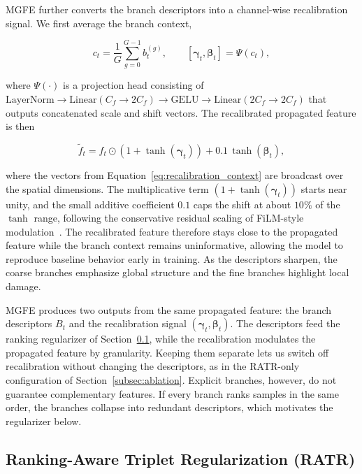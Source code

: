 MGFE further converts the branch descriptors into a channel-wise recalibration signal. We first average the branch context,

\begin{equation}
c_t = \frac{1}{G}\sum_{g=0}^{G-1}b_t^{(g)},
\qquad
[\boldsymbol{\gamma}_t,\boldsymbol{\beta}_t] = \Psi(c_t),
\label{eq:recalibration_context}
\end{equation}

where $\Psi(\cdot)$ is a projection head consisting of $\mathrm{LayerNorm}\!\rightarrow\!\mathrm{Linear}(C_f\!\rightarrow\!2C_f)\!\rightarrow\!\mathrm{GELU}\!\rightarrow\!\mathrm{Linear}(2C_f\!\rightarrow\!2C_f)$ that outputs concatenated scale and shift vectors. The recalibrated propagated feature is then

\begin{equation}
\widetilde{f}_t =
f_t \odot
\left(1+\tanh(\boldsymbol{\gamma}_t)\right)
+ 0.1\,\tanh(\boldsymbol{\beta}_t),
\label{eq:recalibration}
\end{equation}

where the vectors from Equation~\eqref{eq:recalibration_context} are broadcast over the spatial dimensions. The multiplicative term $(1+\tanh(\boldsymbol{\gamma}_t))$ starts near unity, and the small additive coefficient $0.1$ caps the shift at about $10\%$ of the $\tanh$ range, following the conservative residual scaling of FiLM-style modulation~\cite{perez2018film}. The recalibrated feature therefore stays close to the propagated feature while the branch context remains uninformative, allowing the model to reproduce baseline behavior early in training. As the descriptors sharpen, the coarse branches emphasize global structure and the fine branches highlight local damage.

MGFE produces two outputs from the same propagated feature: the branch descriptors $B_t$ and the recalibration signal $(\boldsymbol{\gamma}_t, \boldsymbol{\beta}_t)$. The descriptors feed the ranking regularizer of Section~\ref{subsec:ratr}, while the recalibration modulates the propagated feature by granularity. Keeping them separate lets us switch off recalibration without changing the descriptors, as in the RATR-only configuration of Section~\ref{subsec:ablation}. Explicit branches, however, do not guarantee complementary features. If every branch ranks samples in the same order, the branches collapse into redundant descriptors, which motivates the regularizer below.

\subsection{Ranking-Aware Triplet Regularization (RATR)}
\label{subsec:ratr}

